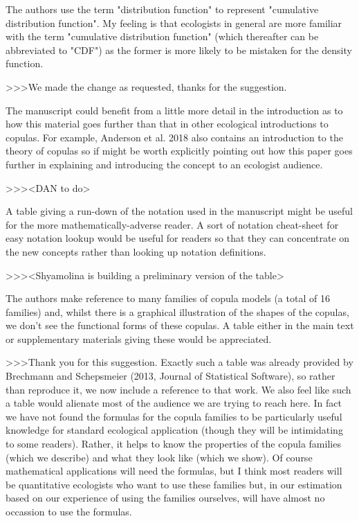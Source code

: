 The authors use the term "distribution function" to represent "cumulative distribution 
function".  My feeling is that ecologists in general are more familiar with the term 
"cumulative distribution function" (which thereafter can be abbreviated to "CDF") as the 
former is more likely to be mistaken for the density function.

>>>We made the change as requested, thanks for the suggestion.

The manuscript could benefit from a little more detail in the introduction as to how 
this material goes further than that in other ecological introductions to copulas.  
For example, Anderson et al. 2018 also contains an introduction to the theory of copulas 
so if might be worth explicitly pointing out how this paper goes further in explaining 
and introducing the concept to an ecologist audience.

>>><DAN to do>

A table giving a run-down of the notation used in the manuscript might be useful for the 
more mathematically-adverse reader.  A sort of notation cheat-sheet for easy notation 
lookup would be useful for readers so that they can concentrate on the new concepts rather 
than looking up notation definitions.

>>><Shyamolina is building a preliminary version of the table>

The authors make reference to many families of copula models (a total of 16 families) and, 
whilst there is a graphical illustration of the shapes of the copulas, we don't see the 
functional forms of these copulas.  A table either in the main text or supplementary materials 
giving these would be appreciated.
 
>>>Thank you for this suggestion. Exactly such a table was already provided by Brechmann 
and Schepsmeier (2013, Journal of Statistical Software), so rather than reproduce it, we
now include a reference to that work. We also feel like such a table would alienate most
of the audience we are trying to reach here. In fact we have not found the formulas
for the copula families to be particularly useful knowledge for standard ecological 
application (though they will be intimidating to some readers). Rather, it helps to 
know the properties of the copula families (which we describe) and what they look 
like (which we show). Of course mathematical applications will need the formulas, but 
I think most readers will be quantitative ecologists who want to use these families 
but, in our estimation based on our experience of using the families ourselves, will 
have almost no occassion to use the formulas.

